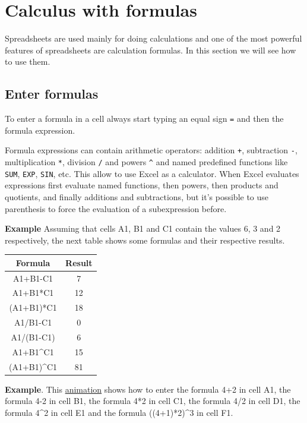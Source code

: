 
\chapter{Calculus with formulas}

Spreadsheets are used mainly for doing calculations and one of the most powerful features of spreadsheets are
calculation formulas. In this section we will see how to use them.

\section{Enter formulas}\hypertarget{enter-formulas}{}\label{enter-formulas}

To enter a formula in a cell always start typing an equal sign \texttt{=} and then the formula expression.

Formula expressions can contain arithmetic operators: addition \texttt{+}, subtraction \texttt{-}, multiplication
\texttt{*}, division \texttt{/} and powers \texttt{\^{}} and named predefined functions like \texttt{SUM}, \texttt{EXP},
\texttt{SIN}, etc. This allow to use Excel as a calculator. When Excel evaluates expressions first evaluate named
functions, then powers, then products and quotients, and finally additions and subtractions, but it's possible to use
parenthesis to force the evaluation of a subexpression before.

\textbf{Example} Assuming that cells A1, B1 and C1 contain the values 6, 3 and 2 respectively, the next table shows some
formulas and their respective results.

\begin{longtable}{cc}
\toprule
Formula & Result\\
\midrule
\endfirsthead
A1+B1-C1 & 7\\
A1+B1*C1 & 12\\
(A1+B1)*C1 & 18\\
A1/B1-C1 & 0\\
A1/(B1-C1) & 6\\
A1+B1\^{}C1 & 15\\
(A1+B1)\^{}C1 & 81\\
\bottomrule
\end{longtable}



\textbf{Example}. This \href{http://aprendeconalf.es/office/excel/manual/img/example_enter_formulas.gif}{animation} shows how to enter the formula 4+2 in cell A1, the formula 4-2 in cell B1, the formula 4*2 in cell C1, the formula 4/2 in cell D1, the formula 4\^{}2 in cell E1 and the formula ((4+1)*2)\^{}3 in cell F1.

